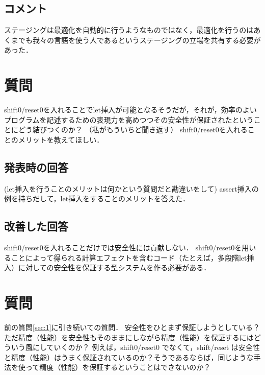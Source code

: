\documentclass[10pt,a4j,xcolor=dvipsnames,twocolumn]{jarticle}
\theoremstyle{definition}
\begin{document}
\subsection{コメント}
ステージングは最適化を自動的に行うようなものではなく，最適化を行うのはあくまでも我々の言語を使う人であるというステージングの立場を共有する必要があった．

\section{質問}
\label{sec:2}
shift0/reset0を入れることでlet挿入が可能となるそうだが，それが，効率のよいプログラムを記述するための表現力を高めつつその安全性が保証されたということにどう結びつくのか？
（私がもういちど聞き返す）
shift0/reset0を入れることのメリットを教えてほしい．

\subsection{発表時の回答}
(let挿入を行うことのメリットは何かという質問だと勘違いをして)
assert挿入の例を持ちだして，let挿入をすることのメリットを答えた．

\subsection{改善した回答}
shift0/reset0を入れることだけでは安全性には貢献しない．
shift0/reset0を用いることによって得られる計算エフェクトを含むコード（たとえば，多段階let挿入）に対しての安全性を保証する型システムを作る必要がある．



\section{質問}
\label{sec:3}
前の質問\ref{sec:1}に引き続いての質問．
安全性をひとまず保証しようとしている？ただ精度（性能）を安全性もそのままにしながら精度（性能）を保証するにはどういう風にしていくのか？
例えば，shift0/reset0 でなくて，shift/reset は安全性と精度（性能）はうまく保証されているのか？そうであるならば，同じような手法を使って精度（性能）を保証するということはできないのか？
\end{document}
